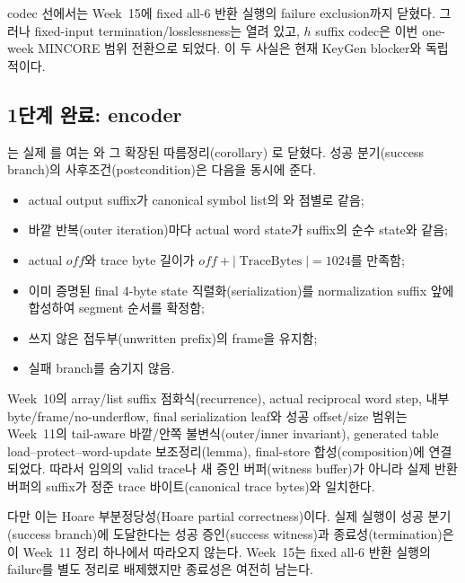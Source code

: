 codec 선에서는 Week~15에 fixed all-6 반환 실행의 failure exclusion까지 닫혔다.
그러나 fixed-input termination/losslessness는 열려 있고, \(h\) suffix codec은
이번 one-week MINCORE 범위 전환으로 \statusdeferred 되었다. 이 두 사실은 현재
KeyGen blocker와 독립적이다.

\subsection{1단계 완료: encoder}

는 실제
를 여는
와 그 확장된 따름정리(corollary)
로 닫혔다. 성공 분기(success
branch)의 사후조건(postcondition)은 다음을 동시에 준다.

\begin{itemize}
  \item actual output suffix가 canonical symbol list의
        와 점별로 같음;
  \item 바깥 반복(outer iteration)마다 actual word state가 suffix의 순수
         state와 같음;
  \item actual \(off\)와 trace byte 길이가
        \(off+|\operatorname{TraceBytes}|=1024\)를 만족함;
  \item 이미 증명된 final 4-byte state 직렬화(serialization)를 normalization
        suffix 앞에 합성하여 segment 순서를 확정함;
  \item 쓰지 않은 접두부(unwritten prefix)의 frame을 유지함;
  \item 실패 branch를 숨기지 않음.
\end{itemize}

Week~10의 array/list suffix 점화식(recurrence), actual reciprocal word step,
내부 byte/frame/no-underflow, final serialization leaf와 성공 offset/size 범위는
Week~11의 tail-aware 바깥/안쪽 불변식(outer/inner invariant), generated table
load--protect--word-update 보조정리(lemma), final-store 합성(composition)에
연결되었다. 따라서 임의의 valid trace나 새 증인 버퍼(witness buffer)가 아니라
실제 반환 버퍼의 suffix가 정준 trace 바이트(canonical trace bytes)와 일치한다.

다만 이는 Hoare 부분정당성(Hoare partial correctness)이다. 실제 실행이 성공
분기(success branch)에 도달한다는 성공 증인(success witness)과 종료성(termination)은
이 Week~11 정리 하나에서 따라오지 않는다. Week~15는 fixed all-6 반환 실행의
failure를 별도 정리로 배제했지만 종료성은 여전히 남는다.

